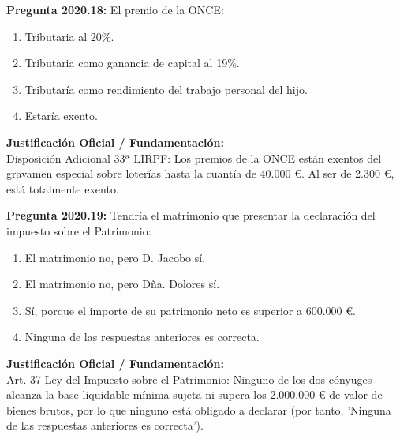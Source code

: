 \documentclass[11pt,a4paper,openany]{article}
\begin{document}
\noindent\textbf{\sffamily Pregunta 2020.18:} El premio de la ONCE:\\[0.15cm]
\begin{enumerate}[label=\textbf{\alph*)},leftmargin=1.8em,itemsep=1.5pt,topsep=2pt,partopsep=0pt,parsep=0pt]
    \item Tributaria al 20\%.
    \item Tributaria como ganancia de capital al 19\%.
    \item Tributaría como rendimiento del trabajo personal del hijo.
    \item Estaría exento.
\end{enumerate}
\begin{solucionBox}
\textbf{Justificación Oficial / Fundamentación:}\\[0.1cm]
Disposición Adicional 33ª LIRPF: Los premios de la ONCE están exentos del gravamen especial sobre loterías hasta la cuantía de 40.000 \euro{}. Al ser de 2.300 \euro{}, está totalmente exento.
\end{solucionBox}
\vspace{0.35cm}

\noindent\textbf{\sffamily Pregunta 2020.19:} Tendría el matrimonio que presentar la declaración del impuesto sobre el Patrimonio:\\[0.15cm]
\begin{enumerate}[label=\textbf{\alph*)},leftmargin=1.8em,itemsep=1.5pt,topsep=2pt,partopsep=0pt,parsep=0pt]
    \item El matrimonio no, pero D. Jacobo sí.
    \item El matrimonio no, pero Dña. Dolores sí.
    \item Sí, porque el importe de su patrimonio neto es superior a 600.000 \euro{}.
    \item Ninguna de las respuestas anteriores es correcta.
\end{enumerate}
\begin{solucionBox}
\textbf{Justificación Oficial / Fundamentación:}\\[0.1cm]
Art. 37 Ley del Impuesto sobre el Patrimonio: Ninguno de los dos cónyuges alcanza la base liquidable mínima sujeta ni supera los 2.000.000 \euro{} de valor de bienes brutos, por lo que ninguno está obligado a declarar (por tanto, 'Ninguna de las respuestas anteriores es correcta').
\end{solucionBox}
\vspace{0.35cm}
\end{document}
